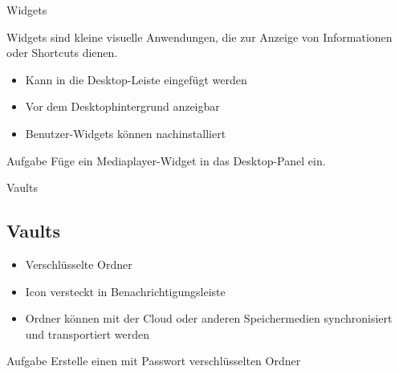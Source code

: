 \begin{frame}{Widgets}

    Widgets sind kleine visuelle Anwendungen, die zur Anzeige von Informationen oder Shortcuts
    dienen.

    \pause

    \begin{itemize}
        \item Kann in die Desktop-Leiste eingefügt werden\pause
        \item Vor dem Desktophintergrund anzeigbar\pause
        \item Benutzer-Widgets können nachinstalliert
    \end{itemize}

    \pause
    \vspace{0.5cm}
    \begin{alertblock}{Aufgabe}
        Füge ein Mediaplayer-Widget in das Desktop-Panel ein.
    \end{alertblock}
\end{frame}

\begin{frame}{Vaults}
    \subsection{Vaults}\label{subsec:vaults}
    \begin{itemize}
        \item Verschlüsselte Ordner\pause
        \item Icon versteckt in Benachrichtigungsleiste\pause
        \item Ordner können mit der Cloud oder anderen Speichermedien synchronisiert und
        transportiert werden
    \end{itemize}

    \pause
    \vspace{0.5cm}
    \begin{alertblock}{Aufgabe}
        Erstelle einen mit Passwort verschlüsselten Ordner
    \end{alertblock}
\end{frame}